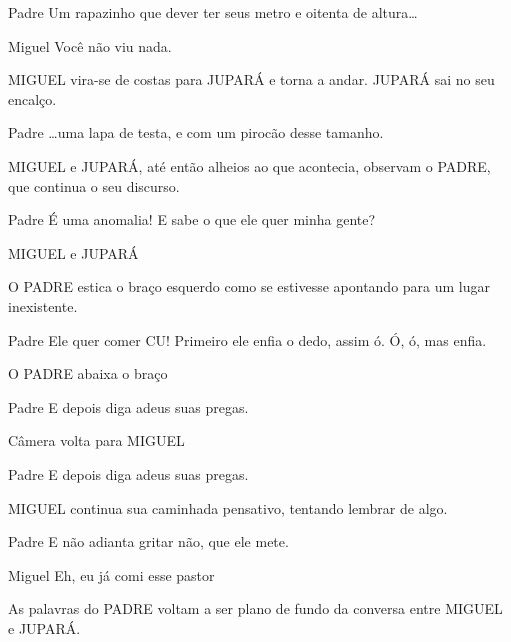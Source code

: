 \documentclass{screenplay}
\begin{document}
\begin{dialogue}{Padre}
    Um rapazinho que dever ter seus metro e oitenta de altura\dots
\end{dialogue}

\begin{dialogue}{Miguel}
    Você não viu nada.
\end{dialogue}

MIGUEL vira-se de costas para JUPARÁ e torna a andar. JUPARÁ sai no seu encalço.

\begin{dialogue}{Padre}
    \dots uma lapa de testa, e com um pirocão desse tamanho.
\end{dialogue}

MIGUEL e JUPARÁ, até então alheios ao que acontecia, observam o PADRE, que continua o seu discurso.

\begin{dialogue}{Padre}
    É uma anomalia! E sabe o que ele quer minha gente?
\end{dialogue}

MIGUEL e JUPARÁ \pov

O PADRE estica o braço esquerdo como se estivesse apontando para um lugar inexistente.

\begin{dialogue}{Padre}
    Ele quer comer CU!
    Primeiro ele enfia o dedo, assim ó. Ó, ó, mas enfia.
\end{dialogue}

O PADRE abaixa o braço

\begin{dialogue}{Padre}
    E depois diga adeus suas pregas.
\end{dialogue}

Câmera volta para MIGUEL

\begin{dialogue}{Padre}
    E depois diga adeus suas pregas.
\end{dialogue}

MIGUEL continua sua caminhada pensativo, tentando lembrar de algo.

\begin{dialogue}{Padre}
    E não adianta gritar não, que ele mete.
\end{dialogue}

\begin{dialogue}{Miguel}
    Eh, eu já comi esse pastor
\end{dialogue}

As palavras do PADRE voltam a ser plano de fundo da conversa entre MIGUEL e JUPARÁ.
\end{document}
